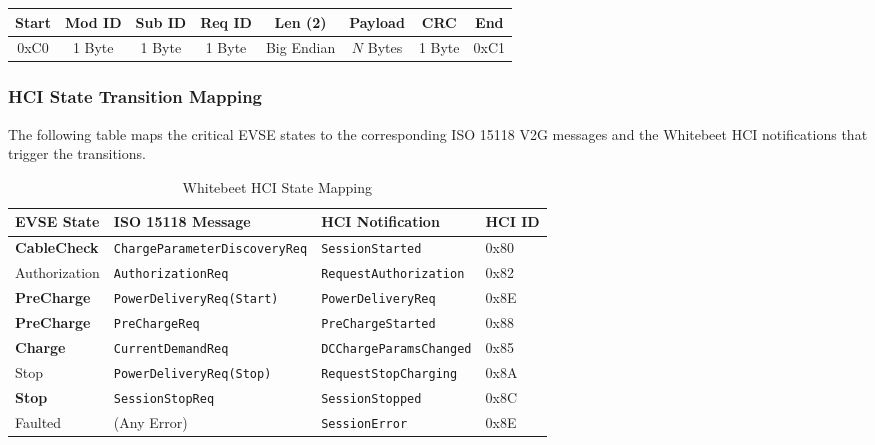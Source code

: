 \documentclass[a4paper,11pt]{report}
\begin{document}
\begin{center}
\begin{tabular}{|c|c|c|c|c|c|c|c|}
\hline
\textbf{Start} & \textbf{Mod ID} & \textbf{Sub ID} & \textbf{Req ID} & \textbf{Len (2)} & \textbf{Payload} & \textbf{CRC} & \textbf{End} \\
\hline
0xC0 & 1 Byte & 1 Byte & 1 Byte & Big Endian & $N$ Bytes & 1 Byte & 0xC1 \\
\hline
\end{tabular}
\end{center}

\subsubsection{HCI State Transition Mapping}
The following table maps the critical EVSE states to the corresponding ISO 15118 V2G messages and the Whitebeet HCI notifications that trigger the transitions.

\begin{table}[H]
    \centering
    \begin{tabular}{|l|l|l|l|}
    \hline
    \textbf{EVSE State} & \textbf{ISO 15118 Message} & \textbf{HCI Notification} & \textbf{HCI ID} \\ \hline
    \rowcolor{gray!10} \textbf{CableCheck} & \texttt{ChargeParameterDiscoveryReq} & \texttt{SessionStarted} & 0x80 \\ \hline
    Authorization & \texttt{AuthorizationReq} & \texttt{RequestAuthorization} & 0x82 \\ \hline
    \rowcolor{gray!10} \textbf{PreCharge} & \texttt{PowerDeliveryReq(Start)} & \texttt{PowerDeliveryReq} & 0x8E \\ \hline
    \textbf{PreCharge} & \texttt{PreChargeReq} & \texttt{PreChargeStarted} & 0x88 \\ \hline
    \rowcolor{gray!10} \textbf{Charge} & \texttt{CurrentDemandReq} & \texttt{DCChargeParamsChanged} & 0x85 \\ \hline
    Stop & \texttt{PowerDeliveryReq(Stop)} & \texttt{RequestStopCharging} & 0x8A \\ \hline
    \rowcolor{gray!10} \textbf{Stop} & \texttt{SessionStopReq} & \texttt{SessionStopped} & 0x8C \\ \hline
    Faulted & (Any Error) & \texttt{SessionError} & 0x8E \\ \hline
    \end{tabular}
    \caption{Whitebeet HCI State Mapping}
    \label{tab:hci_mapping}
\end{table}
\end{document}
